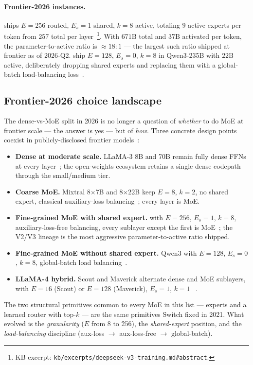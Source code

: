 \paragraph{Frontier-2026 instances.}
 ships $E = 256$ routed, $E_s = 1$ shared, $k = 8$ active,
totaling $9$ active experts per token from $257$ total per
layer~\citep[abstract,
\S 2]{deepseek-v3}\footnote{KB excerpt:
\nolinkurl{kb/excerpts/deepseek-v3-training.md#abstract}.}. With $671\mathrm{B}$
total  and $37\mathrm{B}$ activated per token, the
parameter-to-active ratio is $\approx 18\!:\!1$ ---
the largest such ratio shipped at frontier as of
2026-Q2. \citet{qwen3} ship $E = 128$, $E_s = 0$, $k = 8$ in
Qwen3-235B with $22\mathrm{B}$ active, deliberately dropping shared
experts and replacing them with a global-batch load-balancing
loss~\citep{qwen3}.

\subsection{Frontier-2026 choice landscape}
\label{sec:ffn-frontier}

The dense-vs-MoE split in 2026 is no longer a question of
\emph{whether} to do MoE at frontier scale --- the answer is yes ---
but of \emph{how}. Three concrete design points coexist
in publicly-disclosed frontier
models~\citep{meta-llama3,meta-llama4,deepseek-v3,qwen3,mixtral2024}:
\begin{itemize}
\item \textbf{Dense at moderate scale.} LLaMA-3 8B and 70B remain
    fully dense  FFNs at every layer~\citep{meta-llama3}; the
    open-weights ecosystem retains a single dense codepath through
    the small/medium tier.
\item \textbf{Coarse MoE.} Mixtral 8$\times$7B and 8$\times$22B keep
    $E = 8$, $k = 2$, no shared expert, classical
    auxiliary-loss balancing~\citep{mixtral2024}; every layer is MoE.
\item \textbf{Fine-grained MoE with shared expert.}  with
    $E = 256$, $E_s = 1$, $k = 8$, auxiliary-loss-free balancing,
    every  sublayer except the first is
    MoE~\citep{deepseek-v3}; the V2/V3 lineage is the most
    aggressive parameter-to-active ratio shipped.
\item \textbf{Fine-grained MoE without shared expert.} Qwen3 with
    $E = 128$, $E_s = 0$, $k = 8$, global-batch load
    balancing~\citep{qwen3}.
\item \textbf{LLaMA-4 hybrid.} Scout and Maverick alternate dense and
    MoE  sublayers, with $E = 16$ (Scout) or $E = 128$ (Maverick),
    $E_s = 1$, $k = 1$ ~\citep{meta-llama4}.
\end{itemize}
The two structural primitives common to every MoE in this list ---
 experts and a learned  router with top-$k$ ---
are the same primitives Switch fixed in 2021. What evolved is the
\emph{granularity} ($E$ from 8 to 256), the \emph{shared-expert}
position, and the \emph{load-balancing} discipline (aux-loss $\to$
aux-loss-free $\to$ global-batch).

